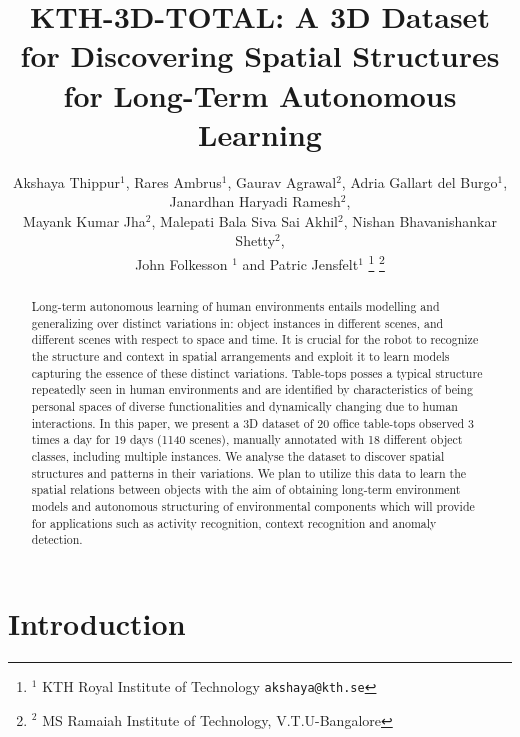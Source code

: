 \documentclass[letterpaper, 10 pt, conference]{ieeeconf}  %
\title{\LARGE \bf
KTH-3D-TOTAL: A 3D Dataset for Discovering Spatial Structures for Long-Term Autonomous
 Learning
}
\author{Akshaya Thippur$^{1}$, Rares Ambrus$^{1}$, Gaurav Agrawal$^{2}$, Adria Gallart del Burgo$^{1}$, Janardhan Haryadi Ramesh$^{2}$, \\Mayank Kumar Jha$^{2}$, Malepati Bala Siva Sai Akhil$^{2}$,  Nishan Bhavanishankar Shetty$^{2}$, \\John Folkesson $^{1}$ and Patric Jensfelt$^{1}$%
\thanks{$^{1}$ KTH Royal Institute of Technology
        {\tt\small akshaya@kth.se}}%
\thanks{$^{2}$ MS Ramaiah Institute of Technology, V.T.U-Bangalore}%
}
\begin{document}
\maketitle
\thispagestyle{empty}
\pagestyle{empty}

\begin{abstract}

%

Long-term autonomous learning of human environments entails modelling 
and generalizing over distinct variations in: object instances in different scenes, 
and different scenes with respect to space and time. It is crucial for the 
robot to recognize the structure and context in spatial arrangements and 
exploit it to learn models capturing the essence of these distinct variations.
Table-tops posses a typical structure repeatedly seen in human environments
and are identified by characteristics of being personal spaces of diverse
functionalities and dynamically changing due to human interactions. In this
paper, we present a 3D dataset of 20 office table-tops observed 3 times a 
day for 19 days (1140 scenes), manually annotated with 18 different object 
classes, including multiple instances. We analyse the dataset to discover 
spatial structures and patterns in their variations. We plan to utilize 
this data to learn the spatial relations between objects with the 
aim of obtaining long-term environment models and autonomous structuring 
of environmental components which will provide for applications such 
as activity recognition, context recognition and anomaly detection.
\end{abstract}


\section{Introduction}
\label{sec:Introduction}
\end{document}
